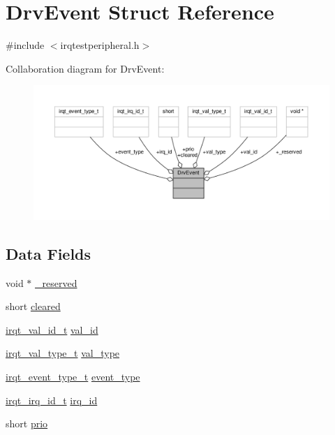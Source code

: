 \hypertarget{struct_drv_event}{}\section{Drv\+Event Struct Reference}
\label{struct_drv_event}


{\ttfamily \#include $<$irqtestperipheral.\+h$>$}



Collaboration diagram for Drv\+Event\+:\nopagebreak
\begin{figure}[H]
\begin{center}
\leavevmode
\includegraphics[width=350pt]{struct_drv_event__coll__graph}
\end{center}
\end{figure}
\subsection*{Data Fields}
\begin{DoxyCompactItemize}
\item 
void $\ast$ \hyperlink{struct_drv_event_abb7722001f04208434c040733ffba3c9}{\+\_\+reserved}
\item 
short \hyperlink{struct_drv_event_ac831d1d2fd8bf5bb89ec82259d1930a2}{cleared}
\item 
\hyperlink{irqtestperipheral_8h_a3485d29696b63704b7a6454519c3d0c5}{irqt\+\_\+val\+\_\+id\+\_\+t} \hyperlink{struct_drv_event_aae5ff1cc4fe7007a28ec8c8e7ad7fcad}{val\+\_\+id}
\item 
\hyperlink{irqtestperipheral_8h_a6354e3cbd47a9004937a59f50ede5080}{irqt\+\_\+val\+\_\+type\+\_\+t} \hyperlink{struct_drv_event_a7f525ede95582d630aa5071200d67e74}{val\+\_\+type}
\item 
\hyperlink{irqtestperipheral_8h_a48709c47aad349276bf7506397c044f9}{irqt\+\_\+event\+\_\+type\+\_\+t} \hyperlink{struct_drv_event_a7fb79c00664b2e1634d12eed5b49af7f}{event\+\_\+type}
\item 
\hyperlink{irqtestperipheral_8h_a53f93f474fe7c9fa2072c6e9cea3d6ef}{irqt\+\_\+irq\+\_\+id\+\_\+t} \hyperlink{struct_drv_event_a0b4c8b371cfeb7c552ac3922ac9526ba}{irq\+\_\+id}
\item 
short \hyperlink{struct_drv_event_adcd29556d7e74ba2cb03422da6683017}{prio}
\end{DoxyCompactItemize}


